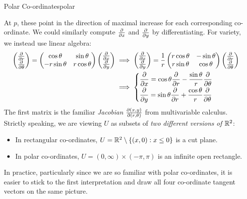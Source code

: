\begin{example}{Polar Co-ordinates}{polar}
\begin{minipage}[t]{0.39\linewidth}
\end{minipage}\bigbreak
At $p$, these point in the direction of maximal increase for each corresponding co-ordinate.\smallbreak
We could similarly compute $\partials x$ and $\partials y$ by differentiating. For variety, we instead use linear algebra:
\begin{align*}
\twovec{\partials r}{\partials\theta}
=
\begin{pmatrix}
\cos\theta&\sin\theta\\
-r\sin\theta&r\cos\theta
\end{pmatrix}
\twovec{\partials x}{\partials y}
&\implies
\twovec{\partials x}{\partials y}
=
\frac 1r\begin{pmatrix}
r\cos\theta&-\sin\theta\\
r\sin\theta&\cos\theta
\end{pmatrix}
\twovec{\partials r}{\partials\theta}\\
&\implies
\begin{cases}
\displaystyle \partials x=\cos\theta\partials r-\frac{\sin\theta}r\partials\theta\\[5pt]
\displaystyle \partials y=\sin\theta\partials r+\frac{\cos\theta}r\partials\theta
\end{cases}
\end{align*}
The first matrix is the familiar \emph{Jacobian} $\partials[(x,y)]{(r,\theta)}$ from multivariable calculus.
Strictly speaking, we are viewing $U$ as subsets of \emph{two different versions of $\R^2$}:
\begin{itemize}
  \item In rectangular co-ordinates, $U=\R^2\setminus\{(x,0):x\le 0\}$ is a cut plane.
  \item In polar co-ordinates, $U=(0,\infty)\times(-\pi,\pi)$ is an infinite open rectangle.
\end{itemize}
In practice, particularly since we are so familiar with polar co-ordinates, it is easier to stick to the first interpretation and draw all four co-ordinate tangent vectors on the same picture.
\end{example}


\clearpage


